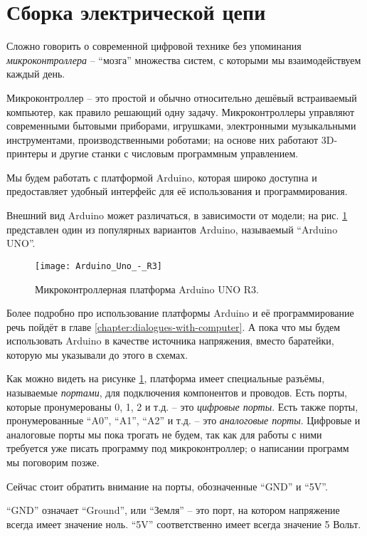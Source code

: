 \documentclass[../sparc.tex]{subfiles}
\begin{document}
\section{Сборка электрической цепи}

Сложно говорить о современной цифровой технике без упоминания
\emph{микроконтроллера} -- ``мозга'' множества систем, с которыми мы
взаимодействуем каждый день.

Микроконтроллер -- это простой и обычно относительно дешёвый встраиваемый
компьютер, как правило решающий одну задачу.  Микроконтроллеры управляют
современными бытовыми приборами, игрушками, электронными музыкальными
инструментами, производственными роботами; на основе них работают 3D-принтеры и
другие станки с числовым программным управлением.

Мы будем работать с платформой Arduino, которая широко доступна и предоставляет
удобный интерфейс для её использования и программирования.

Внешний вид Arduino может различаться, в зависимости от модели; на
рис. \ref{fig:arduino-uno-r3} представлен один из популярных вариантов Arduino,
называемый ``Arduino UNO''.

\begin{figure}[ht]
  \centering
  \texttt{[image: Arduino\_Uno\_-\_R3]}
  \caption{Микроконтроллерная платформа Arduino UNO R3.}
  \label{fig:arduino-uno-r3}
\end{figure}

Более подробно про использование платформы Arduino и её программирование речь
пойдёт в главе \ref{chapter:dialogues-with-computer}.  А пока что мы будем
использовать Arduino в качестве источника напряжения, вместо баратейки, которую
мы указывали до этого в схемах.

Как можно видеть на рисунке \ref{fig:arduino-uno-r3}, платформа имеет
специальные разъёмы, называемые \emph{портами}, для подключения компонентов и
проводов.  Есть порты, которые пронумерованы 0, 1, 2 и т.д. -- это \emph{цифровые
порты}.  Есть также порты, пронумерованные ``A0'', ``A1'', ``A2'' и т.д. -- это
\emph{аналоговые порты}.  Цифровые и аналоговые порты мы пока трогать не будем,
так как для работы с ними требуется уже писать программу под микроконтроллер; о
написании программ мы поговорим позже.

Сейчас стоит обратить внимание на порты, обозначенные ``GND'' и ``5V''.

``GND'' означает ``Ground'', или ``Земля'' -- это порт, на котором напряжение
всегда имеет значение ноль. ``5V'' соответственно имеет всегда значение 5 Вольт.
\end{document}
